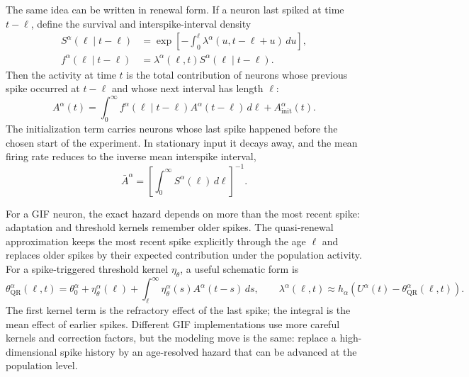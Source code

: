 The same idea can be written in renewal form. If a neuron last spiked at
time \(t-\ell\), define the survival and interspike-interval density
%
\begin{align}
  S^\alpha(\ell\mid t-\ell)
  &=
  \exp\!\left[
    -\int_0^\ell
    \lambda^\alpha(u,t-\ell+u)\,du
  \right],
  \label{eq:ch03-survival}
  \\
  f^\alpha(\ell\mid t-\ell)
  &=
  \lambda^\alpha(\ell,t)S^\alpha(\ell\mid t-\ell).
  \label{eq:ch03-isi-density}
\end{align}
%
Then the activity at time \(t\) is the total contribution of neurons whose
previous spike occurred at \(t-\ell\) and whose next interval has length
\(\ell\):
%
\begin{equation}
  A^\alpha(t)
  =
  \int_0^\infty
  f^\alpha(\ell\mid t-\ell)
  A^\alpha(t-\ell)\,d\ell
  + A_{\mathrm{init}}^\alpha(t).
  \label{eq:ch03-renewal-activity}
\end{equation}
%
The initialization term carries neurons whose last spike happened before the
chosen start of the experiment. In stationary input it decays away, and the
mean firing rate reduces to the inverse mean interspike interval,
%
\begin{equation}
  \bar A^\alpha
  =
  \left[
    \int_0^\infty S^\alpha(\ell)\,d\ell
  \right]^{-1}.
  \label{eq:ch03-stationary-renewal-rate}
\end{equation}

For a GIF neuron, the exact hazard depends on more than the most recent spike:
adaptation and threshold kernels remember older spikes. The quasi-renewal
approximation keeps the most recent spike explicitly through the age \(\ell\)
and replaces older spikes by their expected contribution under the population
activity. For a spike-triggered threshold kernel \(\eta_\theta\), a useful
schematic form is
%
\begin{equation}
  \theta_{\mathrm{QR}}^\alpha(\ell,t)
  =
  \theta_0^\alpha
  + \eta_\theta^\alpha(\ell)
  + \int_\ell^\infty
  \eta_\theta^\alpha(s)A^\alpha(t-s)\,ds,
  \qquad
  \lambda^\alpha(\ell,t)
  \approx
  h_\alpha\!\left(U^\alpha(t)-\theta_{\mathrm{QR}}^\alpha(\ell,t)\right).
  \label{eq:ch03-quasi-renewal-threshold}
\end{equation}
%
The first kernel term is the refractory effect of the last spike; the integral
is the mean effect of earlier spikes. Different GIF implementations use more
careful kernels and correction factors, but the modeling move is the same:
replace a high-dimensional spike history by an age-resolved hazard that can be
advanced at the population level.

